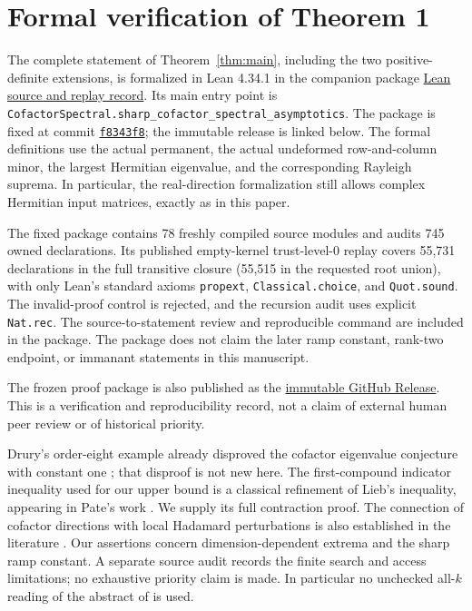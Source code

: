 \documentclass[11pt]{article}
\begin{document}
\section{Formal verification of Theorem 1}
The complete statement of Theorem~\ref{thm:main}, including the two
positive-definite extensions, is formalized in Lean 4.34.1 in the companion
package \href{https://github.com/mxym/math/tree/f8343f8e0b6b3638896bd092b9b476e406660a05/formalizations/cofactor-spectral-asymptotics-progress}{Lean source and replay record}. Its main entry point is
\texttt{CofactorSpectral.\allowbreak sharp\_cofactor\_spectral\_asymptotics}.
The package is fixed at commit
\href{https://github.com/mxym/math/tree/f8343f8e0b6b3638896bd092b9b476e406660a05/formalizations/cofactor-spectral-asymptotics-progress}{
\texttt{f8343f8}}; the immutable release is linked below.
The formal definitions use the actual permanent, the actual undeformed
row-and-column minor, the largest Hermitian eigenvalue, and the corresponding
Rayleigh suprema. In particular, the real-direction formalization still
allows complex Hermitian input matrices, exactly as in this paper.

The fixed package contains 78 freshly compiled source modules and audits 745
owned declarations. Its published empty-kernel trust-level-0 replay covers
55,731 declarations in the full transitive closure (55,515 in the requested
root union), with only Lean's standard axioms
\texttt{propext}, \texttt{Classical.choice}, and \texttt{Quot.sound}.
The invalid-proof control is rejected, and the recursion audit uses explicit
\texttt{Nat.rec}. The source-to-statement review and reproducible command are
included in the package. The package does not claim the later ramp constant,
rank-two endpoint, or immanant statements in this manuscript.

The frozen proof package is also published as the
\href{https://github.com/mxym/math/releases/tag/cofactor-spectral-theorem1-lean-v1}{immutable GitHub Release}. This is a verification and
reproducibility record, not a claim of external human peer review or of
historical priority.

Drury's order-eight example already disproved the cofactor eigenvalue
conjecture with constant one \cite{drury}; that disproof is not new here.
The first-compound indicator inequality used for our upper bound is a classical
refinement of Lieb's inequality, appearing in Pate's work \cite{pate96}.
We supply its full contraction proof. The connection of cofactor directions
with local Hadamard perturbations is also established in the literature
\cite{pioge}. Our assertions concern dimension-dependent extrema and the
sharp ramp constant. A separate source audit records the finite search and
access limitations; no exhaustive priority claim is made. In particular no
unchecked all-$k$ reading of the abstract of \cite{pate08} is used.
\end{document}
